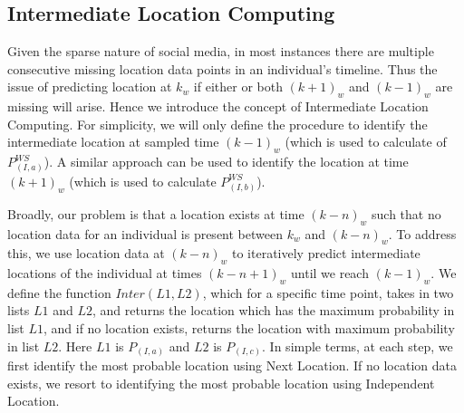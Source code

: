 \subsection{Intermediate Location Computing}
Given the sparse nature of social media, in most instances there are multiple consecutive missing location data points in an individual's timeline. Thus the issue of predicting location at $k_w$ if either or both $(k+1)_w$ and $(k-1)_w$ are missing will arise. Hence we introduce the concept of Intermediate Location Computing. For simplicity, we will only define the procedure to identify the intermediate location at sampled time $(k-1)_w$ (which is used to calculate of $P_{(I,a)}^{WS}$). A similar approach can be used to identify the location at time $(k+1)_w$ (which is used to calculate $P_{(I,b)}^{WS}$).



Broadly, our problem is that a location exists at time $(k-n)_w$ such that no location data for an individual is present between $k_w$ and $(k-n)_w$. To address this, we use location data at $(k-n)_w$ to iteratively predict intermediate locations of the individual at times $(k-n+1)_w$ until we reach $(k-1)_w$. We define the function $Inter(L1,L2)$, which for a specific time point, takes in two lists $L1$ and $L2$, and returns the location which has the maximum probability in list $L1$, and if no location exists, returns the location with maximum probability in list $L2$. Here $L1$ is $P_{(I,a)}$ and $L2$ is $P_{(I,c)}$. In simple terms, at each step, we first identify the most probable location using Next Location. If no location data exists, we resort to identifying the most probable location using Independent Location.  

